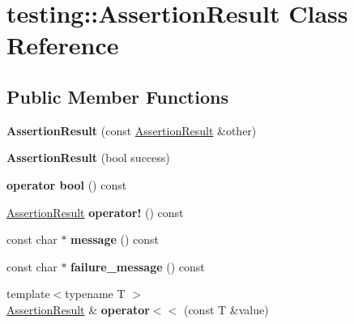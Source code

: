 \hypertarget{classtesting_1_1_assertion_result}{}\section{testing\+:\+:Assertion\+Result Class Reference}
\label{classtesting_1_1_assertion_result}
\subsection*{Public Member Functions}
\begin{DoxyCompactItemize}
\item 
\hypertarget{classtesting_1_1_assertion_result_a27788116f03f90aec4daf592fd809ead}{}{\bfseries Assertion\+Result} (const \hyperlink{classtesting_1_1_assertion_result}{Assertion\+Result} \&other)\label{classtesting_1_1_assertion_result_a27788116f03f90aec4daf592fd809ead}

\item 
\hypertarget{classtesting_1_1_assertion_result_ade695178c05c4b2f82e92930c912fc25}{}{\bfseries Assertion\+Result} (bool success)\label{classtesting_1_1_assertion_result_ade695178c05c4b2f82e92930c912fc25}

\item 
\hypertarget{classtesting_1_1_assertion_result_af85b7852e6399467cd74df539810abcd}{}{\bfseries operator bool} () const \label{classtesting_1_1_assertion_result_af85b7852e6399467cd74df539810abcd}

\item 
\hypertarget{classtesting_1_1_assertion_result_a85301ba52aa1efe89b79d1e3b59160cd}{}\hyperlink{classtesting_1_1_assertion_result}{Assertion\+Result} {\bfseries operator!} () const \label{classtesting_1_1_assertion_result_a85301ba52aa1efe89b79d1e3b59160cd}

\item 
\hypertarget{classtesting_1_1_assertion_result_ab20c91eba13e20f1b4ad89e3d15f69a8}{}const char $\ast$ {\bfseries message} () const \label{classtesting_1_1_assertion_result_ab20c91eba13e20f1b4ad89e3d15f69a8}

\item 
\hypertarget{classtesting_1_1_assertion_result_ae54fa82506c507a9dbc0f85d2cec652a}{}const char $\ast$ {\bfseries failure\+\_\+message} () const \label{classtesting_1_1_assertion_result_ae54fa82506c507a9dbc0f85d2cec652a}

\item 
\hypertarget{classtesting_1_1_assertion_result_a3230efa81aafe7c61f5fb878cfa39e91}{}{\footnotesize template$<$typename T $>$ }\\\hyperlink{classtesting_1_1_assertion_result}{Assertion\+Result} \& {\bfseries operator$<$$<$} (const T \&value)\label{classtesting_1_1_assertion_result_a3230efa81aafe7c61f5fb878cfa39e91}


\end{DoxyCompactItemize}
